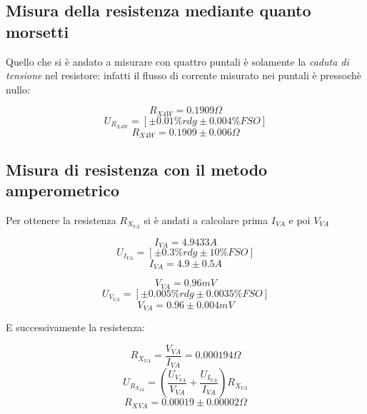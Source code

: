 \documentclass[a4paper]{article}
\begin{document}
\subsection{Misura della resistenza mediante quanto morsetti}
Quello che si è andato a misurare con quattro puntali è solamente la \emph{caduta di tensione} nel resistore: infatti il flusso di corrente misurato nei puntali è pressochè nullo:
\begin{Large}
	\begin{equation}
		R_{X4W}= 0.1909 \Omega
	\end{equation}
	\begin{equation}
		U_{R_{X4W}} = [\pm 0.01\%rdg \pm 0.004\% FSO]
	 \end{equation}
	 \begin{equation}
		R_{X4W} = 0.1909\pm 0.006 \Omega
	 \end{equation}
\end{Large}
\subsection{Misura di resistenza con il metodo amperometrico}
Per ottenere la resistenza $R_{X_{VA}}$ si è andati a calcolare prima $I_{VA}$ e poi $V_{VA}$
\begin{Large}
	\begin{equation}
		I_{VA}= 4.9433 A
	\end{equation}
	\begin{equation}
		U_{I_{VA}} = [\pm 0.3\%rdg \pm 10\% FSO]
	 \end{equation}
	 \begin{equation}
		I_{VA} = 4.9 \pm 0.5 A
	 \end{equation}
\end{Large}

\begin{Large}
	\begin{equation}
		V_{VA}= 0.96 mV
	\end{equation}
	\begin{equation}
		U_{V_{VA}} = [\pm 0.005\%rdg \pm 0.0035\% FSO]
	 \end{equation}
	 \begin{equation}
		V_{VA} = 0.96 \pm 0.004 mV
	 \end{equation}
\end{Large}
E successivamente la resistenza:
\begin{Large}
	\begin{equation}
		R_{X_{VA}}= \frac{V_{VA}}{I_{VA}} =0.000194 \Omega
	\end{equation}
	\begin{equation}
		U_{R_{X_{VA}}} = (\frac{U_{V_{VA}}}{V_{VA}}+\frac{U_{I_{VA}}}{I_{VA}})R_{X_{VA}}
	 \end{equation}
	 \begin{equation}
		R_X{_{VA}} = 0.00019\pm 0.00002\Omega
	 \end{equation}
\end{Large}
\end{document}
